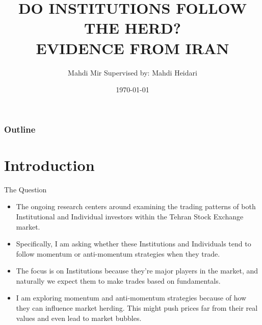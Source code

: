\documentclass{beamer}
\title[]{\MakeUppercase{Do Institutions Follow the Herd? \\ Evidence from Iran}}
\subtitle{}
\author[]{Mahdi Mir \newline Supervised by: Mahdi Heidari}
\institute[TeIAS]{Tehran Institute for Advanced Studies}
\date[TeIAS]{\today}
\begin{document}

\begin{frame}
    \titlepage{}
\end{frame}


\begin{frame}[label=toc]
    \frametitle{Outline}
    \tableofcontents{}
\end{frame}



\section{Introduction}







\begin{frame}{The Question}

    \begin{itemize}
        \item The ongoing research centers around examining the trading patterns of both Institutional and Individual investors within the Tehran Stock Exchange market.
        \item Specifically, I am asking whether these Institutions and Individuals tend to follow momentum or anti-momentum strategies when they trade.
        \item The focus is on Institutions because they're major players in the market, and naturally we expect them to make trades based on fundamentals.
        \item I am exploring momentum and anti-momentum strategies because of how they can influence market herding. This might push prices far from their real values and even lead to market bubbles.
    \end{itemize}

\end{frame}










\end{document}
